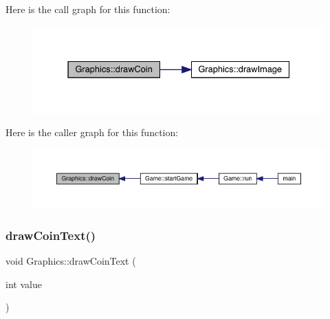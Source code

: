 Here is the call graph for this function\+:\nopagebreak
\begin{figure}[H]
\begin{center}
\leavevmode
\includegraphics[width=331pt]{class_graphics_a62b98d9f52ad55e9bd8617130cfbf37b_cgraph}
\end{center}
\end{figure}
Here is the caller graph for this function\+:\nopagebreak
\begin{figure}[H]
\begin{center}
\leavevmode
\includegraphics[width=350pt]{class_graphics_a62b98d9f52ad55e9bd8617130cfbf37b_icgraph}
\end{center}
\end{figure}
\mbox{\label{class_graphics_adaecfa8fab0e04636cb575d7599494d6}} 
\subsubsection{\texorpdfstring{draw\+Coin\+Text()}{drawCoinText()}}
{\footnotesize\ttfamily void Graphics\+::draw\+Coin\+Text (\begin{DoxyParamCaption}\item[{int}]{value }\end{DoxyParamCaption})}

